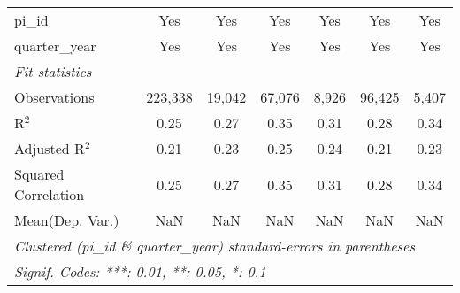\begin{tabular}{lcccccc}
   pi\_id                                                     & Yes            & Yes             & Yes           & Yes          & Yes           & Yes\\  
   quarter\_year                                              & Yes            & Yes             & Yes           & Yes          & Yes           & Yes\\  
   \midrule
   \emph{Fit statistics}\\
   Observations                                               & 223,338        & 19,042          & 67,076        & 8,926        & 96,425        & 5,407\\  
   R$^2$                                                      & 0.25           & 0.27            & 0.35          & 0.31         & 0.28          & 0.34\\  
   Adjusted R$^2$                                             & 0.21           & 0.23            & 0.25          & 0.24         & 0.21          & 0.23\\  
   Squared Correlation                                        & 0.25           & 0.27            & 0.35          & 0.31         & 0.28          & 0.34\\  
Mean(Dep. Var.) & NaN & NaN & NaN & NaN & NaN & NaN \\
   \midrule \midrule
   \multicolumn{7}{l}{\emph{Clustered (pi\_id \& quarter\_year) standard-errors in parentheses}}\\
   \multicolumn{7}{l}{\emph{Signif. Codes: ***: 0.01, **: 0.05, *: 0.1}}\\
\end{tabular}
\par\endgroup
